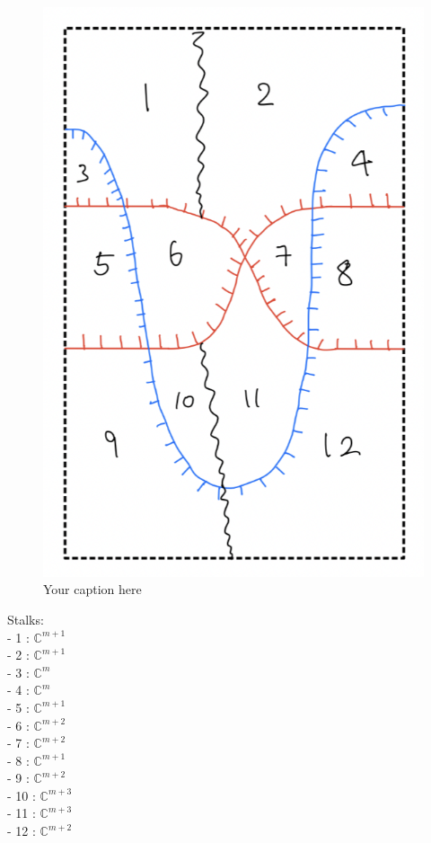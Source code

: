 \begin{figure}[H] %
    \centering
    \includegraphics[scale = 0.95]{diagrams/lemma10/2.png} %
    \caption{Your caption here}
    \label{fig:your-label}
\end{figure}

Stalks:\\
- 1 : $\mathbb{C}^{m+1}$\\
- 2 : $\mathbb{C}^{m+1}$\\
- 3 : $\mathbb{C}^{m}$\\
- 4 : $\mathbb{C}^{m}$\\
- 5 : $\mathbb{C}^{m+1}$\\
- 6 : $\mathbb{C}^{m+2}$\\
- 7 : $\mathbb{C}^{m+2}$\\
- 8 : $\mathbb{C}^{m+1}$\\
- 9 : $\mathbb{C}^{m+2}$\\
- 10 : $\mathbb{C}^{m+3}$\\
- 11 : $\mathbb{C}^{m+3}$\\
- 12 : $\mathbb{C}^{m+2}$\\

